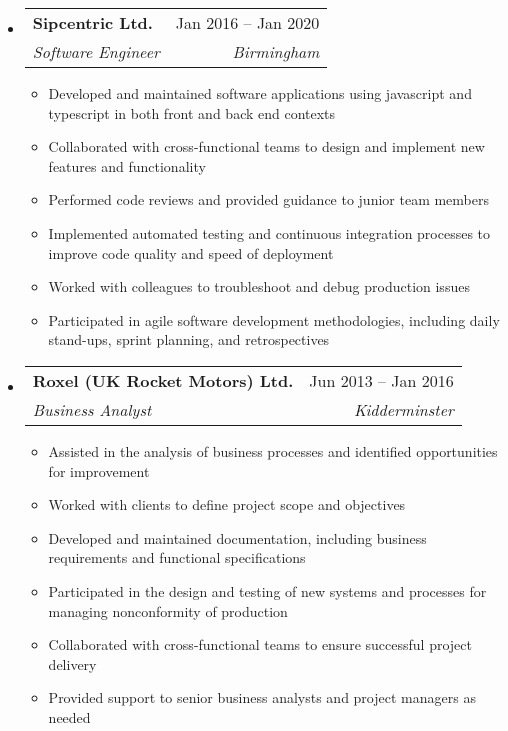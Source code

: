 \documentclass[a4paper,12pt]{article}[leftmargin=*]
\makeatletter
\def \entryspacing {-0pt}
\renewcommand{\section}[2]{\vspace{5pt}
  \colorbox{secondary}{\color{white}\raggedbottom\normalsize\textbf{{#1}{\hspace{7pt}#2}}}
}
\newcommand{\resumeEntryStart}{\begin{itemize}[leftmargin=2.5mm]}
\newcommand{\resumeEntryEnd}{\end{itemize}\vspace{\entryspacing}}
\newcommand{\resumeItemListStart}{\begin{itemize}[leftmargin=4.5mm]}
\newcommand{\resumeItemListEnd}{\end{itemize}}
\newcommand{\resumeItem}[1]{
  \item\small{
    {#1 \vspace{-2pt}}
  }
}
\newcommand{\resumeEntryTSDL}[4]{
  \vspace{-1pt}\item[]
    \begin{tabularx}{0.97\textwidth}{X@{\hspace{60pt}}r}
      \textbf{\color{primary}#1} & {\firabook\color{accent}\small#2} \\
      \textit{\color{accent}\small#3} & \textit{\color{accent}\small#4} \\
    \end{tabularx}\vspace{-6pt}
}
\newcommand{\resumeEntryS}[2]{
  \item[]\small{
    \textbf{\color{primary}#1 }{ #2 \vspace{-6pt}}
  }
}
\makeatother
\begin{document}
  \resumeEntryStart
    \resumeEntryTSDL
      {Sipcentric Ltd.}{Jan 2016 -- Jan 2020}
      {Software Engineer}{Birmingham}
    \resumeItemListStart
      \resumeItem {Developed and maintained software applications using javascript and typescript in both front and back end contexts}
      \resumeItem {Collaborated with cross-functional teams to design and implement new features and functionality}
      \resumeItem {Performed code reviews and provided guidance to junior team members}
      \resumeItem {Implemented automated testing and continuous integration processes to improve code quality and speed of deployment}
      \resumeItem {Worked with colleagues to troubleshoot and debug production issues}
      \resumeItem {Participated in agile software development methodologies, including daily stand-ups, sprint planning, and retrospectives}
    \resumeItemListEnd
  \resumeEntryEnd

  \resumeEntryStart
    \resumeEntryTSDL
      {Roxel (UK Rocket Motors) Ltd.}{Jun 2013 -- Jan 2016}
      {Business Analyst}{Kidderminster}
    \resumeItemListStart
        \resumeItem {Assisted in the analysis of business processes and identified opportunities for improvement}
        \resumeItem {Worked with clients to define project scope and objectives}
        \resumeItem {Developed and maintained documentation, including business requirements and functional specifications}
        \resumeItem {Participated in the design and testing of new systems and processes for managing nonconformity of production}
        \resumeItem {Collaborated with cross-functional teams to ensure successful project delivery}
        \resumeItem {Provided support to senior business analysts and project managers as needed}
    \resumeItemListEnd
  \resumeEntryEnd

\end{document}
